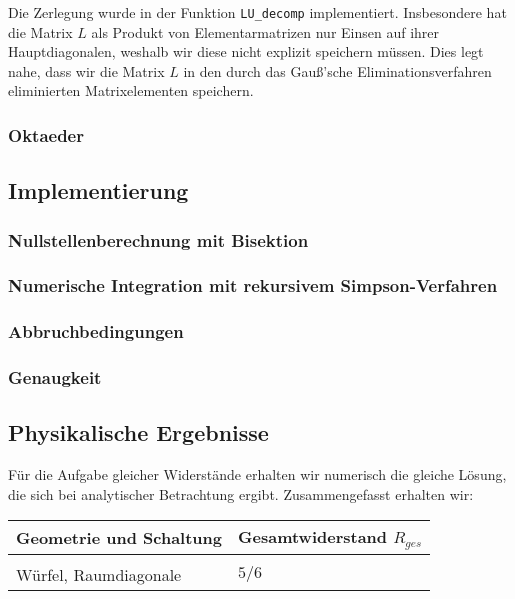 \documentclass[10pt,a4paper]{article}
\begin{document}
Die Zerlegung wurde in der Funktion \texttt{LU\_decomp} implementiert. Insbesondere hat die Matrix $L$ als Produkt von Elementarmatrizen nur Einsen auf ihrer Hauptdiagonalen, weshalb wir diese nicht explizit speichern müssen. Dies legt nahe, dass wir die Matrix $L$ in den durch das Gauß'sche Eliminationsverfahren eliminierten Matrixelementen speichern.


\subsubsection{Oktaeder}

\subsection{Implementierung}

\subsubsection{Nullstellenberechnung mit Bisektion}

\subsubsection{Numerische Integration mit rekursivem Simpson-Verfahren}


\subsubsection{Abbruchbedingungen}

\subsubsection{Genaugkeit}

\subsection{Physikalische Ergebnisse}

Für die Aufgabe gleicher Widerstände erhalten wir numerisch die gleiche Lösung, die sich bei analytischer Betrachtung ergibt. Zusammengefasst erhalten wir:
\begin{table}[htbp!]
\centering
\begin{tabular}{l|l}
Geometrie und Schaltung & Gesamtwiderstand $R_{ges}$\\\hline
\\
Würfel, Raumdiagonale & $5/6$
\end{tabular}
\end{table}
\end{document}
